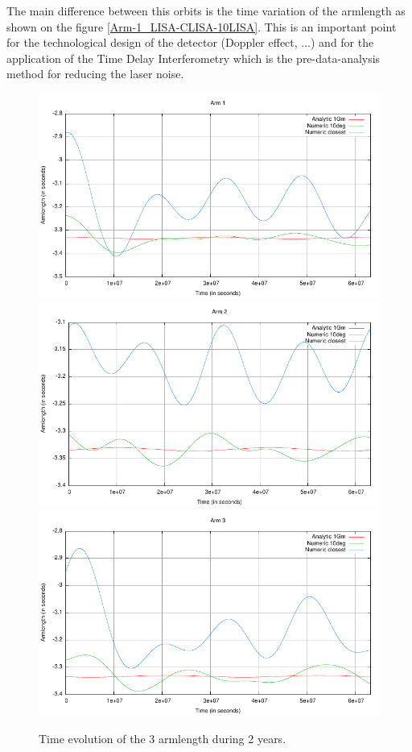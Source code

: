 \documentclass{iopart}
\begin{document}
The main difference between this orbits is the time variation of the armlength as shown on the figure \ref{Arm-1_LISA-CLISA-10LISA}.
This is an important point for the technological design of the detector (Doppler effect, ...) and for the application of the Time Delay Interferometry which is the pre-data-analysis method for reducing the laser noise. 

\begin{figure}
\begin{center}
\includegraphics[scale=0.5,clip]{FigNoiseOrbSens/Arm-1_LISA-CLISA-10LISA.pdf}
\includegraphics[scale=0.5,clip]{FigNoiseOrbSens/Arm-2_LISA-CLISA-10LISA.pdf}
\includegraphics[scale=0.5,clip]{FigNoiseOrbSens/Arm-3_LISA-CLISA-10LISA.pdf} 
\end{center}
\caption{Time evolution of the 3 armlength during 2 years.
\label{F:ArmEvol} } 
\end{figure}
\end{document}
